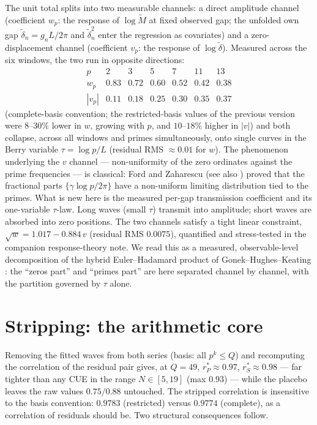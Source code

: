 \documentclass[12pt]{amsart}
\begin{document}
The unit total splits into two measurable channels: a direct amplitude
channel (coefficient $w_p$: the response of $\log \tilde M$ at fixed
observed gap; the unfolded own gap $\tilde\delta_n = g_n L/2\pi$ and $\tilde\delta_n^2$
enter the regression as covariates) and a zero-displacement channel (coefficient $v_p$: the
response of $\log \tilde\delta$). Measured across the six windows, the two
run in opposite directions:
\[
\begin{array}{c|cccccc}
p & 2 & 3 & 5 & 7 & 11 & 13\\ \hline
w_p & 0.83 & 0.72 & 0.60 & 0.52 & 0.42 & 0.38\\
|v_p| & 0.11 & 0.18 & 0.25 & 0.30 & 0.35 & 0.37
\end{array}
\]
(complete-basis convention; the restricted-basis values of the previous
version were $8$--$30\%$ lower in $w$, growing with $p$, and
$10$--$18\%$ higher in $|v|$)
and both collapse, across all windows and primes simultaneously, onto
single curves in the Berry variable $\tau = \log p / L$ \cite{Berry88}
(residual RMS $\approx 0.01$ for $w$). The phenomenon underlying the $v$
channel --- non-uniformity of the zero ordinates against the prime
frequencies --- is classical: Ford and Zaharescu \cite{FZ05} (see also
\cite{FSZ09}) proved that the fractional parts $\{\gamma \log p/2\pi\}$
have a non-uniform limiting distribution tied to the primes. What is new
here is the measured per-gap transmission coefficient and its
one-variable $\tau$-law. Long waves (small $\tau$) transmit
into amplitude; short waves are absorbed into zero positions. The two
channels satisfy a tight linear constraint,
$\sqrt{w} = 1.017 - 0.884\,v$ (residual RMS $0.0075$), quantified and
stress-tested in the companion response-theory note. We read this as a measured,
observable-level decomposition of the hybrid Euler--Hadamard product of
Gonek--Hughes--Keating \cite{GHK07}: the ``zeros part'' and ``primes
part'' are here separated channel by channel, with the partition governed
by $\tau$ alone.

\section{Stripping: the arithmetic core}

Removing the fitted waves from both series (basis: all $p^k \le Q$) and
recomputing the correlation of the residual pair gives, at $Q = 49$,
$r^*_P \approx 0.97$, $r^*_S \approx 0.98$ --- far tighter than any CUE in
the range $N \in [5, 19]$ (max $0.93$) --- while the placebo leaves the raw
values $0.75/0.88$ untouched. The stripped correlation is insensitive to
the basis convention: $0.9783$ (restricted) versus $0.9774$ (complete),
as a correlation of residuals should be. Two structural consequences follow.
\end{document}
